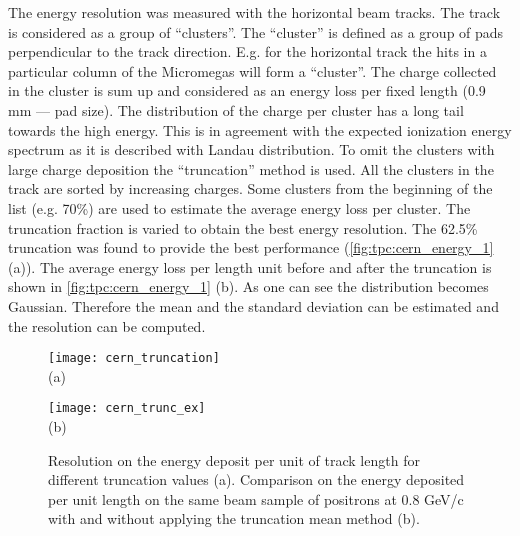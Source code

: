 \documentclass[../main.tex]{subfiles}
\begin{document}
The energy resolution was measured with the horizontal beam tracks. The track is considered as a group of ``clusters''. The ``cluster'' is defined as a group of pads perpendicular to the track direction. E.g. for the horizontal track the hits in a particular column of the Micromegas will form a ``cluster''. The charge collected in the cluster is sum up and considered as an energy loss per fixed length (0.9 mm --- pad size). The distribution of the charge per cluster has a long tail towards the high energy. This is in agreement with the expected ionization energy spectrum as it is described with Landau distribution. To omit the clusters with large charge deposition the ``truncation'' method is used. All the clusters in the track are sorted by increasing charges. Some clusters from the beginning of the list (e.g. 70\%) are used to estimate the average energy loss per cluster. The truncation fraction is varied to obtain the best energy resolution. The 62.5\% truncation was found to provide the best performance (\autoref{fig:tpc:cern_energy_1} (a)). The average energy loss per length unit before and after the truncation is shown in \autoref{fig:tpc:cern_energy_1} (b). As one can see the distribution becomes Gaussian. Therefore the mean and the standard deviation can be estimated and the resolution can be computed.

\begin{figure}[!ht]
  \centering
  \begin{minipage}{0.49\linewidth}
    \centering
    \texttt{[image: cern\_truncation]} \\ (a)
  \end{minipage}
  \begin{minipage}{0.49\linewidth}
    \centering
    \texttt{[image: cern\_trunc\_ex]} \\ (b)
  \end{minipage}
  \caption{Resolution on the energy deposit per unit of track length for different truncation values (a). Comparison on the energy deposited per unit length on the same beam sample of positrons at 0.8 GeV/c with and without applying the truncation mean method (b).}
  \label{fig:tpc:cern_energy_1}
\end{figure}
\end{document}
